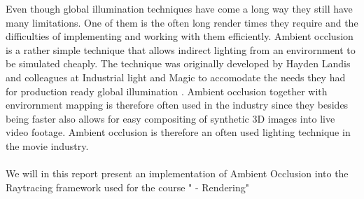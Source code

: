 Even though global illumination techniques have come a long way they still have many limitations. One of them is the often long render times they require and the difficulties of implementing and working with them efficiently. Ambient occlusion is a rather simple technique that allows indirect lighting from an envirornment to be simulated cheaply. The technique was originally developed by Hayden Landis and colleagues at Industrial light and Magic to accomodate the needs they had for production ready global illumination \cite{Landis2002}. Ambient occlusion together with envirornment mapping is therefore often used in the industry since they besides being faster also allows for easy compositing of synthetic 3D images into live video footage\cite{Landis2002}. Ambient occlusion is therefore an often used lighting technique in the movie industry.
\\ \\
We will in this report present an implementation of Ambient Occlusion into the Raytracing framework used for the course " - Rendering"